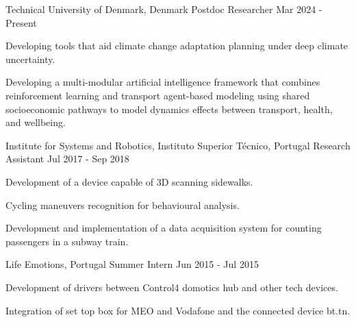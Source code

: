 

\begin{cventries}

  \cventrynograde
    {Technical University of Denmark, Denmark} %
    {Postdoc Researcher} %
    {Mar 2024 - Present} %
    {
      \begin{cvitems} %
        \item {Developing tools that aid climate change adaptation planning under deep climate uncertainty.}
        \item {Developing a multi-modular artificial intelligence framework that combines reinforcement learning and transport agent-based modeling using shared socioeconomic pathways to model dynamics effects between transport, health, and wellbeing.}
      \end{cvitems}
    }


  \cventrynograde
    {Institute for Systems and Robotics, Instituto Superior Técnico, Portugal} %
    {Research Assistant} %
    {Jul 2017 - Sep 2018} %
    {
      \begin{cvitems} %
        \item {Development of a device capable of 3D scanning sidewalks.}
        \item {Cycling maneuvers recognition for behavioural analysis.}
        \item {Development and implementation of a data acquisition system for counting passengers in a subway train.}
      \end{cvitems}
    }


  \cventrynograde
    {Life Emotions, Portugal} %
    {Summer Intern} %
    {Jun 2015 - Jul 2015} %
    {
      \begin{cvitems} %
        \item {Development of drivers between Control4 domotics hub and other tech devices.}
        \item {Integration of set top box for MEO and Vodafone and the connected device bt.tn.}
      \end{cvitems}
    }


\end{cventries}
